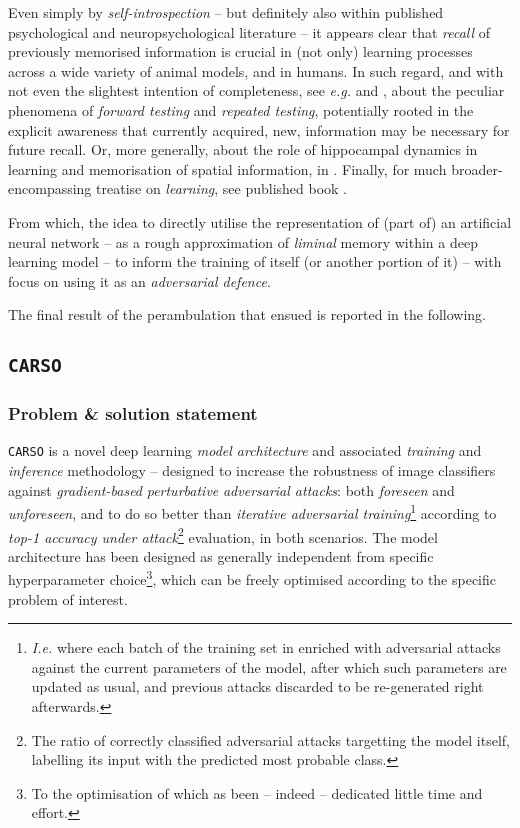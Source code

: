 Even simply by \textit{self-introspection} -- but definitely also within published psychological and neuropsychological literature -- it appears clear that \textit{recall} of previously memorised information is crucial in (not only) learning processes across a wide variety of animal models, and in humans. In such regard, and with not even the slightest intention of completeness, see \textit{e.g.} \cite{McDermott2006ParadoxicalEO} and \cite{YangEtAl2018EnhancingLA}, about the peculiar phenomena of \textit{forward testing} and \textit{repeated testing}, potentially rooted in the explicit awareness that currently acquired, new, information may be necessary for future recall. Or, more generally, about the role of hippocampal dynamics in learning and memorisation of spatial information, in \cite{BirdBurgess2008Hippocampus}. Finally, for much broader-encompassing treatise on \textit{learning}, see published book \cite{Dehaene2018HowWeLearn}.

From which, the idea to directly utilise the representation of (part of) an artificial neural network -- as a rough approximation of \textit{liminal} memory within a deep learning model -- to inform the training of itself (or another portion of it) -- with focus on using it as an \textit{adversarial defence}.

The final result of the perambulation that ensued is reported in the following.

\subsection{\texttt{CARSO}}
\subsubsection{Problem \& solution statement}
\texttt{CARSO} is a novel deep learning \textit{model architecture} and associated \textit{training} and \textit{inference} methodology -- designed to increase the robustness of image classifiers against \textit{gradient-based} \textit{perturbative} \textit{adversarial attacks}: both \textit{foreseen} and \textit{unforeseen}, and to do so better than \textit{iterative adversarial training}\footnote{\textit{I.e.} where each batch of the training set in enriched with adversarial attacks against the current parameters of the model, after which such parameters are updated as usual, and previous attacks discarded to be re-generated right afterwards.} according to \textit{top-1 accuracy under attack}\footnote{The ratio of correctly classified adversarial attacks targetting the model itself, labelling its input with the predicted most probable class.} evaluation, in both scenarios. The model architecture has been designed as generally independent from specific hyperparameter choice\footnote{To the optimisation of which as been -- indeed -- dedicated little time and effort.}, which can be freely optimised according to the specific problem of interest.


